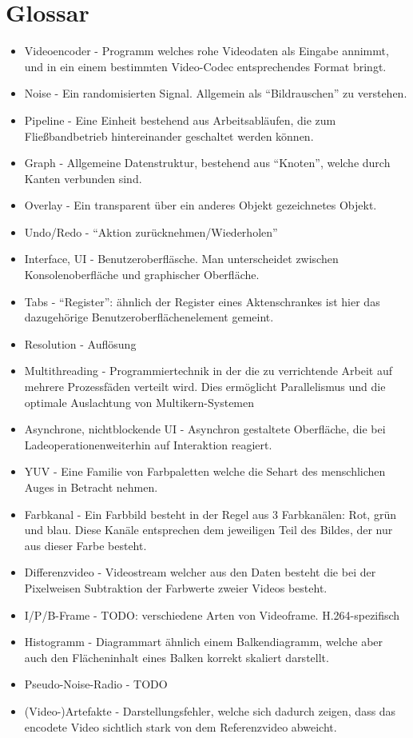 \section{Glossar}

\begin{itemize}
    \item Videoencoder - Programm welches rohe Videodaten als Eingabe annimmt, und in ein einem bestimmten Video-Codec entsprechendes Format bringt.
    \item Noise - Ein randomisierten Signal. Allgemein als ``Bildrauschen'' zu verstehen.
    \item Pipeline - Eine Einheit bestehend aus Arbeitsabläufen, die zum Fließbandbetrieb hintereinander geschaltet werden können.
    \item Graph - Allgemeine Datenstruktur, bestehend aus ``Knoten'', welche durch Kanten verbunden sind.
    \item Overlay - Ein transparent über ein anderes Objekt gezeichnetes Objekt.
    \item Undo/Redo - ``Aktion zurücknehmen/Wiederholen''
    \item Interface, UI - Benutzeroberfläsche. Man unterscheidet zwischen Konsolenoberfläche und graphischer Oberfläche.
    \item Tabs - ``Register'': ähnlich der Register eines Aktenschrankes ist hier das dazugehörige Benutzeroberflächenelement gemeint.
    \item Resolution - Auflösung
    \item Multithreading - Programmiertechnik in der die zu verrichtende Arbeit auf mehrere Prozessfäden verteilt wird. Dies ermöglicht Parallelismus und die optimale Auslachtung von Multikern-Systemen
    \item Asynchrone, nichtblockende UI - Asynchron gestaltete Oberfläche, die bei Ladeoperationenweiterhin auf Interaktion reagiert.
    \item YUV - Eine Familie von Farbpaletten welche die Sehart des menschlichen Auges in Betracht nehmen.
    \item Farbkanal - Ein Farbbild besteht in der Regel aus 3 Farbkanälen: Rot, grün und blau. Diese Kanäle entsprechen dem jeweiligen Teil des Bildes, der nur aus dieser Farbe besteht.
    \item Differenzvideo - Videostream welcher aus den Daten besteht die bei der Pixelweisen Subtraktion der Farbwerte zweier Videos besteht.
    \item I/P/B-Frame - TODO: verschiedene Arten von Videoframe. H.264-spezifisch
    \item Histogramm - Diagrammart ähnlich einem Balkendiagramm, welche aber auch den Flächeninhalt eines Balken korrekt skaliert darstellt.
    \item Pseudo-Noise-Radio - TODO %
    \item (Video-)Artefakte - Darstellungsfehler, welche sich dadurch zeigen, dass das encodete Video sichtlich stark von dem Referenzvideo abweicht.
\end{itemize}

